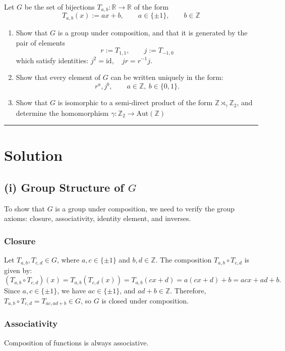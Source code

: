 \documentclass[12pt]{amsart}
\theoremstyle{definition}
\numberwithin{equation}{section}
\newcommand{\Z}{\mathbb{Z}}
\newcommand{\R}{\mathbb{R}}
\begin{document}
\begin{exercise}{6} Let $G$ be the set of bijections \(T_{a,b}: \R \rightarrow \R\) of the form \[T_{a,b}(x) := ax+b, \qquad a \in \{\pm 1\}, \qquad b \in \Z\]


    \begin{enumerate}[label=\textbf{(\roman*)}]
        \item Show that $G$ is a group under composition, and that it is generated by the pair of elements \[r := T_{1,1}, \qquad j:=T_{-1,0}\] which satisfy identities: \(j^2=\text{id}, \quad jr=r^{-1}j\).
        \item Show that every element of $G$ can be written uniquely in the form: \[r^a, j^b, \qquad a\in \Z, \ b \in \{0,1\}.\]
        \item Show that $G$ is isomorphic to a semi-direct product of the form \(\Z \rtimes_\gamma \Z_2\), and determine the homomorphism \(\gamma : \Z_2 \rightarrow \text{Aut}(\Z)\)
    \end{enumerate}

    \noindent\rule{\linewidth}{1pt}
    
\section*{Solution}

    \subsection*{(i) Group Structure of \(G\)}

    To show that \(G\) is a group under composition, we need to verify the group axioms: closure, associativity, identity element, and inverses.

    \subsubsection*{Closure}
    Let \(T_{a,b}, T_{c,d} \in G\), where \(a, c \in \{\pm 1\}\) and \(b, d \in \Z\). The composition \(T_{a,b} \circ T_{c,d}\) is given by:
    \[
    (T_{a,b} \circ T_{c,d})(x) = T_{a,b}(T_{c,d}(x)) = T_{a,b}(cx + d) = a(cx + d) + b = acx + ad + b.
    \]
    Since \(a, c \in \{\pm 1\}\), we have \(ac \in \{\pm 1\}\), and \(ad + b \in \Z\). Therefore, \(T_{a,b} \circ T_{c,d} = T_{ac, ad + b} \in G\), so \(G\) is closed under composition.

    \subsubsection*{Associativity}
    Composition of functions is always associative.


\end{exercise}
\end{document}
